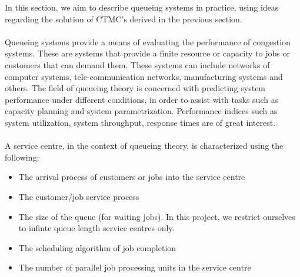 In this section, we aim to describe queueing systems in practice, using ideas regarding the solution of CTMC's derived in the previous section.
\\\\
Queueing systems provide a means of evaluating the performance of congestion systems. These are systems that provide a finite resource or capacity to jobs or customers that can demand them. These systems can include networks of computer systems, tele-communication networks, manufacturing systems and others. The field of queueing theory is concerned with predicting system performance under different conditions, in order to assist with tasks such as capacity planning and system parametrization. Performance indices such as system utilization, system throughput, response times are of great interest. 
\\\\
A service centre, in the context of queueing theory, is characterized using the following:
\begin{itemize}[noitemsep]
    \item The arrival process of customers or jobs into the service centre
    \item The customer/job service process
    \item The size of the queue (for waiting jobs). In this project, we restrict ourselves to infinte queue length service centres only.
    \item The scheduling algorithm of job completion
    \item The number of parallel job processing units in the service centre
\end{itemize}

